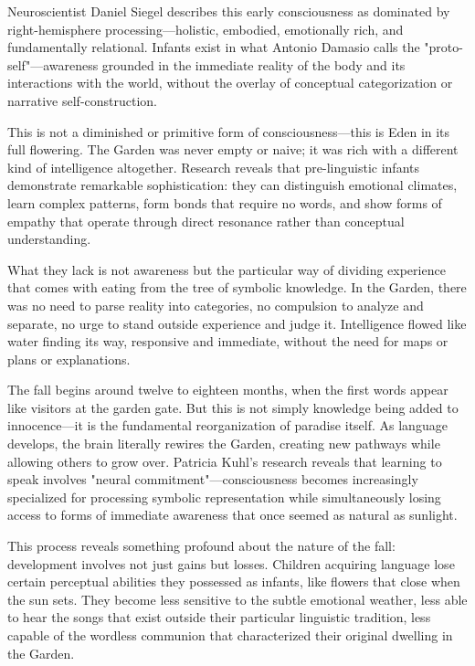Neuroscientist Daniel Siegel describes this early consciousness as dominated by right-hemisphere processing—holistic, embodied, emotionally rich, and fundamentally relational. Infants exist in what Antonio Damasio calls the "proto-self"—awareness grounded in the immediate reality of the body and its interactions with the world, without the overlay of conceptual categorization or narrative self-construction.

This is not a diminished or primitive form of consciousness—this is Eden in its full flowering. The Garden was never empty or naive; it was rich with a different kind of intelligence altogether. Research reveals that pre-linguistic infants demonstrate remarkable sophistication: they can distinguish emotional climates, learn complex patterns, form bonds that require no words, and show forms of empathy that operate through direct resonance rather than conceptual understanding.

What they lack is not awareness but the particular way of dividing experience that comes with eating from the tree of symbolic knowledge. In the Garden, there was no need to parse reality into categories, no compulsion to analyze and separate, no urge to stand outside experience and judge it. Intelligence flowed like water finding its way, responsive and immediate, without the need for maps or plans or explanations.

The fall begins around twelve to eighteen months, when the first words appear like visitors at the garden gate. But this is not simply knowledge being added to innocence—it is the fundamental reorganization of paradise itself. As language develops, the brain literally rewires the Garden, creating new pathways while allowing others to grow over. Patricia Kuhl's research reveals that learning to speak involves "neural commitment"—consciousness becomes increasingly specialized for processing symbolic representation while simultaneously losing access to forms of immediate awareness that once seemed as natural as sunlight.

This process reveals something profound about the nature of the fall: development involves not just gains but losses. Children acquiring language lose certain perceptual abilities they possessed as infants, like flowers that close when the sun sets. They become less sensitive to the subtle emotional weather, less able to hear the songs that exist outside their particular linguistic tradition, less capable of the wordless communion that characterized their original dwelling in the Garden.

